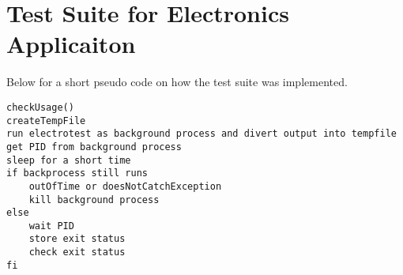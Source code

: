 \documentclass[a4paper,11pt,twoside]{article}
\begin{document}
\section{Test Suite for Electronics Applicaiton}
Below for a short pseudo code on how the test suite was implemented.

\begin{verbatim}
checkUsage()
createTempFile
run electrotest as background process and divert output into tempfile
get PID from background process
sleep for a short time
if backprocess still runs
    outOfTime or doesNotCatchException
    kill background process
else
    wait PID
    store exit status
    check exit status
fi 
\end{verbatim}

%
\end{document}
